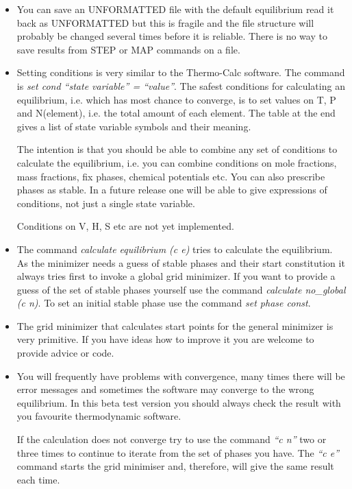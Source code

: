 \documentclass[12pt]{article}
\begin{document}
\begin{itemize}
\item You can save an UNFORMATTED file with the default equilibrium
  read it back as UNFORMATTED but this is fragile and the file
  structure will probably be changed several times before it is
  reliable.  There is no way to save results from STEP or MAP
  commands on a file.

\item Setting conditions is very similar to the Thermo-Calc software.
  The command is {\em set cond ``state variable'' = ``value''}.  The
  safest conditions for calculating an equilibrium, i.e. which has
  most chance to converge, is to set values on T, P and N(element),
  i.e. the total amount of each element.  The table at the end gives a
  list of state variable symbols and their meaning.

  The intention is that you should be able to combine any set of
  conditions to calculate the equilibrium, i.e. you can combine
  conditions on mole fractions, mass fractions, fix phases, chemical
  potentials etc.  You can also prescribe phases as stable.  In a
  future release one will be able to give expressions of conditions,
  not just a single state variable.

  Conditions on V, H, S etc are not yet implemented.

\item The command {\em calculate equilibrium (c e)} tries to calculate
  the equilibrium.  As the minimizer needs a guess of stable phases
  and their start constitution it always tries first to invoke a
  global grid minimizer.  If you want to provide a guess of the set of
  stable phases yourself use the command {\em calculate no\_global (c
    n)}.  To set an initial stable phase use the command {\em set
    phase const}.

\item The grid minimizer that calculates start points for the general
  minimizer is very primitive.  If you have ideas how to improve it
  you are welcome to provide advice or code.

\item You will frequently have problems with convergence, many times
  there will be error messages and sometimes the software may converge
  to the wrong equilibrium.  In this beta test version you should
  always check the result with you favourite thermodynamic software.

  If the calculation does not converge try to use the command {\em ``c
    n''} two or three times to continue to iterate from the set of
  phases you have.  The {\em ``c e''} command starts the grid
  minimiser and, therefore, will give the same result each time.


\end{itemize}
\end{document}

